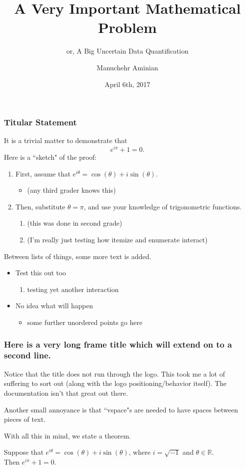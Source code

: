 \documentclass{beamer}
\title{A Very Important Mathematical Problem}
\subtitle{or, A Big Uncertain Data Quantification}
\author[Manuchehr Aminian]{Manuchehr Aminian}
\institute{University of North Carolina, Chapel Hill}
\date{April 6th, 2017}
\newcommand{\titleframe}{
{
\setbeamertemplate{headline}{}
\setbeamertemplate{footline}{}
\begin{frame}
\titlepage
\end{frame}
}
}
\begin{document}
\titleframe


\begin{frame}
\frametitle{Titular Statement}
It is a trivial matter to demonstrate that 
%
\begin{equation}
e^{i\pi}+1=0.
\end{equation}
%
Here is a ``sketch" of the proof:
\begin{enumerate}
\item First, assume that $e^{i \theta} = \cos(\theta) + i \sin(\theta)$.
\begin{itemize}
\item (any third grader knows this)
\end{itemize}
\item Then, substitute $\theta = \pi$, and use your knowledge of trigonometric functions.
\begin{enumerate}
\item (this was done in second grade)
\item (I'm really just testing how itemize and enumerate interact)
\end{enumerate}
\end{enumerate}
%
Between lists of things, some more text is added.
%
\begin{itemize}
\item Test this out too
\begin{enumerate}
\item testing yet another interaction
\end{enumerate}
\item No idea what will happen
\begin{itemize}
\item some further unordered points go here
\end{itemize}
\end{itemize}

\end{frame}
%
\begin{frame}
\frametitle{Here is a very long frame title which 
will extend on to a second line. }
Notice that the title does not run through 
the logo. This took me a lot of suffering to sort out 
(along with the logo positioning/behavior itself). 
The documentation isn't that great out there.
\vspace{1em}

Another small annoyance is that ``vspace"s are needed 
to have spaces between pieces of text.
\vspace{1em}

With all this in mind, we state a theorem.
\begin{theorem}
Suppose that $e^{i\theta} = \cos(\theta) + i\sin(\theta)$, 
where $i=\sqrt{-1}$ and $\theta \in \mathbb{R}$. \\[1em]
Then $e^{i\pi}+1=0$.
\end{theorem}
\end{frame}
\end{document}
